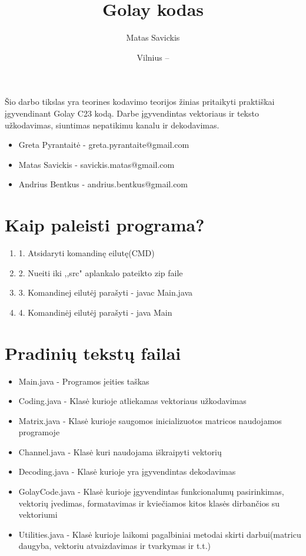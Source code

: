 \documentclass[oneside]{VUMIFPSkursinis}
\title{Golay kodas}
\author{Matas Savickis}
\date{Vilnius – \the\year}
\begin{document}
\maketitle

Šio darbo tikslas yra teorines kodavimo teorijos žinias pritaikyti praktiškai įgyvendinant Golay C23 kodą. Darbe įgyvendintas vektoriaus ir teksto užkodavimas, siuntimas nepatikimu kanalu ir dekodavimas. 

\begin{itemize}
	\item{Greta Pyrantaitė - greta.pyrantaite@gmail.com}
	\item{Matas Savickis - savickis.matas@gmail.com}
	\item{Andrius Bentkus - andrius.bentkus@gmail.com}
\end{itemize}

\tableofcontents

\section{Kaip paleisti programa?}
\begin{enumerate}
	\item{1. Atsidaryti komandinę eilutę(CMD)}
	\item{2. Nueiti iki ,,src" aplankalo pateikto zip faile}
	\item{3. Komandinej eilutėj parašyti - javac Main.java}
	\item{4. Komandinėj eilutėj parašyti - java Main}
\end{enumerate}
\section{Pradinių tekstų failai}
\begin{itemize}
	\item{Main.java - Programos įeities taškas}
	\item{Coding.java - Klasė kurioje atliekamas vektoriaus užkodavimas}
	\item{Matrix.java - Klasė kurioje saugomos inicializuotos matricos naudojamos programoje}
	\item{Channel.java - Klasė kuri naudojama iškraipyti vektorių}
	\item{Decoding.java - Klasė kurioje yra įgyvendintas dekodavimas}
	\item{GolayCode.java - Klasė kurioje įgyvendintas funkcionalumų pasirinkimas, vektorių įvedimas, formatavimas ir kviečiamos kitos klasės dirbančios su vektoriumi}
	\item{Utilities.java - Klasė kurioje laikomi pagalbiniai metodai skirti darbui(matricu daugyba, vektoriu atvaizdavimas ir tvarkymas ir t.t.)}
\end{itemize}
\end{document}
